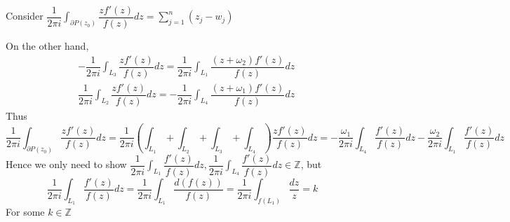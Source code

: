 \documentclass[../main.tex]{subfiles}
\begin{document}
\begin{problem}
Consider $\displaystyle\dfrac{1}{2\pi i}\int_{\partial P(z_0)}\dfrac{zf'(z)}{f(z)}dz=\sum_{j=1}^n(z_j-w_j)$ \par
On the other hand, 
\[
\begin{aligned}
&-\dfrac{1}{2\pi i}\int_{L_3}\dfrac{zf'(z)}{f(z)}dz=\dfrac{1}{2\pi i}\int_{L_1}\dfrac{(z+\omega_2)f'(z)}{f(z)}dz \\
&\dfrac{1}{2\pi i}\int_{L_2}\dfrac{zf'(z)}{f(z)}dz=-\dfrac{1}{2\pi i}\int_{L_4}\dfrac{(z+\omega_1)f'(z)}{f(z)}dz
\end{aligned}
\]
Thus
\[
\dfrac{1}{2\pi i}\int_{\partial P(z_0)}\dfrac{zf'(z)}{f(z)}dz
=\dfrac{1}{2\pi i}\left(\int_{L_1}+\int_{L_2}+\int_{L_3}+\int_{L_4}\right)\dfrac{zf'(z)}{f(z)}dz
=-\dfrac{\omega_1}{2\pi i}\int_{L_4}\dfrac{f'(z)}{f(z)}dz-\dfrac{\omega_2}{2\pi i}\int_{L_1}\dfrac{f'(z)}{f(z)}dz
\]
Hence we only need to show $\displaystyle\dfrac{1}{2\pi i}\int_{L_1}\dfrac{f'(z)}{f(z)}dz,\dfrac{1}{2\pi i}\int_{L_4}\dfrac{f'(z)}{f(z)}dz\in\mathbb{Z}$, but
$$\dfrac{1}{2\pi i}\int_{L_1}\dfrac{f'(z)}{f(z)}dz=\dfrac{1}{2\pi i}\int_{L_1}\dfrac{d(f(z))}{f(z)}=\dfrac{1}{2\pi i}\int_{f(L_1)}\dfrac{dz}{z}=k$$
For some $k\in\mathbb{Z}$
\end{problem}
\end{document}

